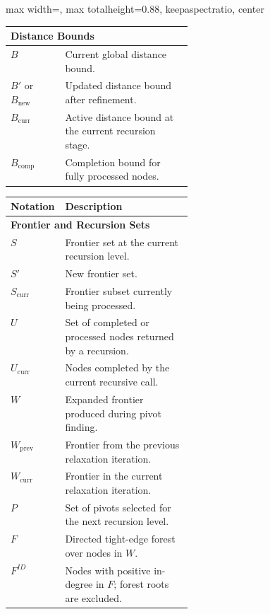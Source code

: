 \documentclass[ijoc,blindrev]{informs3} %
\begin{document}
\begin{table}[!htp]
\begin{adjustbox}{
    max width=\textwidth,
    max totalheight=0.88\textheight,
    keepaspectratio,
    center
}
\begin{minipage}[t]{0.6\textwidth}
\begin{tabularx}{\linewidth}{@{}p{0.30\linewidth}X@{}}
\multicolumn{2}{l}{\textbf{Distance Bounds}} \\
\hline
$B$ & Current global distance bound. \\
$B'$ or $B_{\text{new}}$ & Updated distance bound after refinement. \\
$B_{\text{curr}}$ & Active distance bound at the current recursion stage. \\
$B_{\text{comp}}$ & Completion bound for fully processed nodes. \\
\hline



\end{tabularx}
\end{minipage}
\hspace{0.015\textwidth}
\begin{minipage}[t]{0.6\textwidth}
\scriptsize
\renewcommand{\arraystretch}{0.92}
\setlength{\tabcolsep}{3pt}

\begin{tabularx}{\linewidth}{@{}p{0.30\linewidth}X@{}}
\hline
\textbf{Notation} & \textbf{Description} \\
\hline

\multicolumn{2}{l}{\textbf{Frontier and Recursion Sets}} \\
\hline
$S$ & Frontier set at the current recursion level. \\
$S'$ & New frontier set. \\
$S_{\mathrm{curr}}$ & Frontier subset currently being processed. \\
$U$ & Set of completed or processed nodes returned by a recursion. \\
$U_{\mathrm{curr}}$ & Nodes completed by the current recursive call. \\
$W$ & Expanded frontier produced during pivot finding. \\
$W_{\mathrm{prev}}$ & Frontier from the previous relaxation iteration. \\
$W_{\mathrm{curr}}$ & Frontier in the current relaxation iteration. \\
$P$ & Set of pivots selected for the next recursion level. \\
$F$ & Directed tight-edge forest over nodes in $W$. \\
$F^{ID}$ & Nodes with positive in-degree in $F$; forest roots are excluded. \\
\hline


\end{tabularx}
\end{minipage}
\end{adjustbox}
\end{table}
\end{document}
